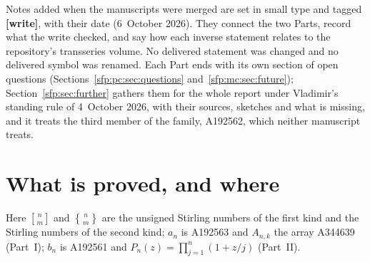 \documentclass[11pt,letterpaper]{article}
\numberwithin{equation}{section}
\theoremstyle{definition}\newtheorem{definition}[theorem]{Definition}
\theoremstyle{remark}\newtheorem{remark}[theorem]{Remark}
\newcommand{\sone}[2]{\genfrac{[}{]}{0pt}{}{#1}{#2}}
\newcommand{\stwo}[2]{\genfrac{\{} {\}}{0pt}{}{#1}{#2}}
\begin{document}
Notes added when the manuscripts were merged are set in small type and tagged \textbf{[write]}, with their date (6~October 2026). They connect the two Parts, record what the write checked, and say how each inverse statement relates to the repository's transseries volume. No delivered statement was changed and no delivered symbol was renamed. Each Part ends with its own section of open questions (Sections~\ref{sfp:pc:sec:questions} and~\ref{sfp:mc:sec:future}); Section~\ref{sfp:sec:further} gathers them for the whole report under Vladimir's standing rule of 4~October 2026, with their sources, sketches and what is missing, and it treats the third member of the family, A192562, which neither manuscript treats.

\section*{What is proved, and where}\label{sfp:sec:status}
Here $\sone nm$ and $\stwo nm$ are the unsigned Stirling numbers of the first kind and the Stirling numbers of the second kind; $a_n$ is A192563 and $A_{n,k}$ the array A344639 (Part~I); $b_n$ is A192561 and $P_n(z)=\prod_{j=1}^n(1+z/j)$ (Part~II).
\end{document}
